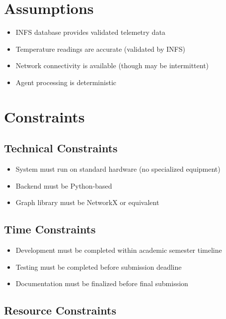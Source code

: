 \section{Assumptions}

\begin{itemize}
    \item INFS database provides validated telemetry data
    \item Temperature readings are accurate (validated by INFS)
    \item Network connectivity is available (though may be intermittent)
    \item Agent processing is deterministic
\end{itemize}

\section{Constraints}

\subsection{Technical Constraints}

\begin{itemize}
    \item System must run on standard hardware (no specialized equipment)
    \item Backend must be Python-based
    \item Graph library must be NetworkX or equivalent
\end{itemize}

\subsection{Time Constraints}

\begin{itemize}
    \item Development must be completed within academic semester timeline
    \item Testing must be completed before submission deadline
    \item Documentation must be finalized before final submission
\end{itemize}

\subsection{Resource Constraints}

